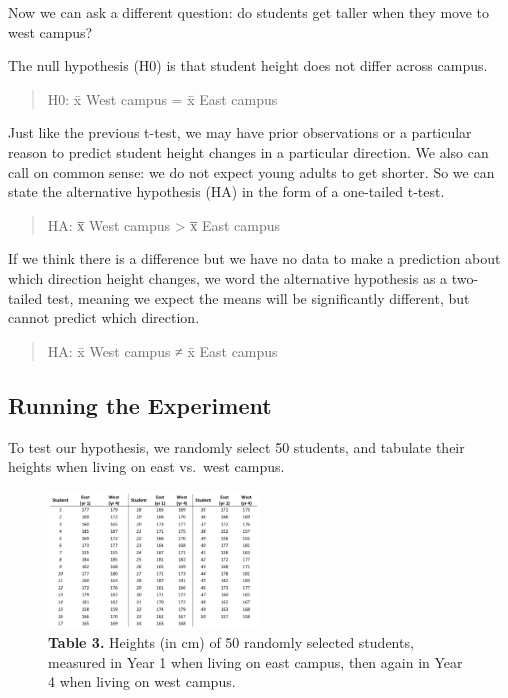 \documentclass[
]{book}
\begin{document}
Now we can ask a different question: do students get taller when they move to west campus?

The null hypothesis (H0) is that student height does not differ across campus.

\begin{quote}
H0: x̄ West campus = x̄ East campus
\end{quote}

Just like the previous t-test, we may have prior observations or a particular reason to predict student height changes in a particular direction. We also can call on common sense: we do not expect young adults to get shorter. So we can state the alternative hypothesis (HA) in the form of a one-tailed t-test.

\begin{quote}
HA: x̅ West campus \textgreater{} x̅ East campus
\end{quote}

If we think there is a difference but we have no data to make a prediction about which direction height changes, we word the alternative hypothesis as a two-tailed test, meaning we expect the means will be significantly different, but cannot predict which direction.

\begin{quote}
HA: x̄ West campus ≠ x̄ East campus
\end{quote}

\hypertarget{running-the-experiment}{%
\subsection{Running the Experiment}\label{running-the-experiment}}

To test our hypothesis, we randomly select 50 students, and tabulate their heights when living on east vs.~west campus.

\begin{figure}
\centering
\includegraphics[width=0.5\textwidth,height=\textheight]{images/Height_table2.png}
\caption{\textbf{Table 3.} Heights (in cm) of 50 randomly selected students, measured in Year 1 when living on east campus, then again in Year 4 when living on west campus.}
\end{figure}
\end{document}
